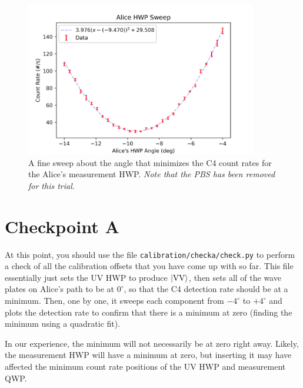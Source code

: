 \documentclass{paper}[11pt]
\begin{document}
	\begin{figure}[p]
		\centering
		\includegraphics[width=0.9\textwidth]{AHWP/AHWP_sweep1.png}
		\caption{A fine sweep about the angle that minimizes the C4 count rates for the Alice's measurement HWP. \textit{Note that the PBS has been removed for this trial.}}
		\label{fig:AHWP minimum fit}
	\end{figure}
	
	\section{Checkpoint A}
	At this point, you should use the file \texttt{calibration/checka/check.py} to perform a check of all the calibration offsets that you have come up with so far. This file essentially just sets the UV HWP to produce $\ket{\text{VV}}$, then sets all of the wave plates on Alice's path to be at $0^\circ$, so that the C4 detection rate should be at a minimum. Then, one by one, it sweeps each component from $-4^\circ$ to $+4^\circ$ and plots the detection rate to confirm that there is a minimum at zero (finding the minimum using a quadratic fit).
	
	In our experience, the minimum will not necessarily be at zero right away. Likely, the measurement HWP will have a minimum at zero, but inserting it may have affected the minimum count rate positions of the UV HWP and measurement QWP.
	
\end{document}
